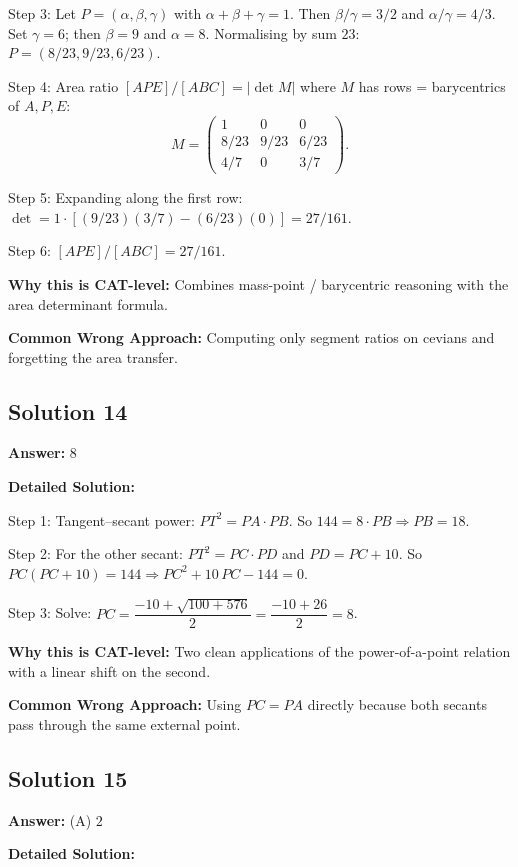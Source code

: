 \documentclass[11pt]{article}
\begin{document}
Step 3: Let \(P=(\alpha,\beta,\gamma)\) with \(\alpha+\beta+\gamma=1\). Then \(\beta/\gamma=3/2\) and \(\alpha/\gamma=4/3\). Set \(\gamma = 6\); then \(\beta = 9\) and \(\alpha = 8\). Normalising by sum \(23\): \(P = (8/23, 9/23, 6/23)\).

Step 4: Area ratio \([APE]/[ABC] = \big|\det M\big|\) where \(M\) has rows = barycentrics of \(A, P, E\):
\[
M=\begin{pmatrix}1 & 0 & 0\\ 8/23 & 9/23 & 6/23\\ 4/7 & 0 & 3/7\end{pmatrix}.
\]

Step 5: Expanding along the first row: \(\det = 1\cdot[(9/23)(3/7) - (6/23)(0)] = 27/161\).

Step 6: \([APE]/[ABC] = 27/161\).

\textbf{Why this is CAT-level:} Combines mass-point / barycentric reasoning with the area determinant formula.

\textbf{Common Wrong Approach:} Computing only segment ratios on cevians and forgetting the area transfer.

\subsection*{Solution 14}

\textbf{Answer:} \(8\)

\textbf{Detailed Solution:}

Step 1: Tangent--secant power: \(PT^2 = PA\cdot PB\). So \(144 = 8\cdot PB \Rightarrow PB = 18\).

Step 2: For the other secant: \(PT^2 = PC\cdot PD\) and \(PD = PC + 10\). So 
\(PC(PC + 10) = 144 \Rightarrow PC^2 + 10\,PC - 144 = 0\).

Step 3: Solve: \(PC = \dfrac{-10 + \sqrt{100 + 576}}{2} = \dfrac{-10+26}{2} = 8\).

\textbf{Why this is CAT-level:} Two clean applications of the power-of-a-point relation with a linear shift on the second.

\textbf{Common Wrong Approach:} Using \(PC = PA\) directly because both secants pass through the same external point.

\subsection*{Solution 15}

\textbf{Answer:} (A) \(2\)

\textbf{Detailed Solution:}
\end{document}
